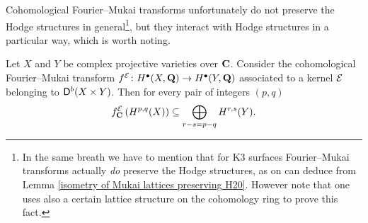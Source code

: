 





Cohomological Fourier--Mukai transforms unfortunately do not preserve the Hodge structures in general\footnote{
    In the same breath we have to mention that for K3 surfaces Fourier--Mukai transforms actually \emph{do} preserve the Hodge structures, as on can deduce from Lemma \ref{isometry of Mukai lattices preserving H20}. However note that one uses also a certain lattice structure on the cohomology ring to prove this fact.
}, but they interact with Hodge structures in a particular way, which is worth noting. 

\begin{proposition}
    \label{Hodge lattice, fm transform interaction}
    Let $X$ and $Y$ be complex projective varieties over $\mathbf C$. Consider the cohomological Fourier--Mukai transform $f^{\mathcal E} \colon H^{\bullet}(X, \mathbf Q) \to H^{\bullet}(Y, \mathbf Q)$ associated to a kernel $\mathcal E$ belonging to $\mathsf{D}^b(X \times Y)$.
    Then for every pair of integers $(p,q)$
    \begin{equation}
        \label{eq: Hodge lattice, fm transform}
        f^{\mathcal E}_\mathbf C\left(H^{p,q}(X)\right) \subseteq \bigoplus_{r - s = p - q} H^{r,s}(Y).
    \end{equation}
\end{proposition}

